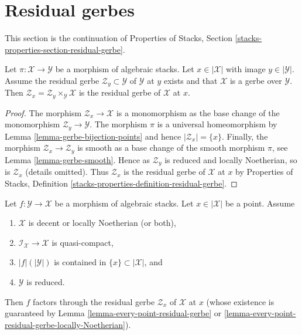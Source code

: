 \section{Residual gerbes}
\label{section-residual-gerbe}

\noindent
This section is the continuation of Properties of Stacks, Section
\ref{stacks-properties-section-residual-gerbe}.

\begin{lemma}
\label{lemma-gerbe-residual-gerbe}
Let $\pi : \mathcal{X} \to \mathcal{Y}$ be a morphism of algebraic stacks.
Let $x \in |\mathcal{X}|$ with image $y \in |\mathcal{Y}|$.
Assume the residual gerbe $\mathcal{Z}_y \subset \mathcal{Y}$
of $\mathcal{Y}$ at $y$ exists and that $\mathcal{X}$ is a gerbe
over $\mathcal{Y}$. Then
$\mathcal{Z}_x = \mathcal{Z}_y \times_\mathcal{Y} \mathcal{X}$ is
the residual gerbe of $\mathcal{X}$ at $x$.
\end{lemma}

\begin{proof}
The morphism $\mathcal{Z}_x \to \mathcal{X}$ is a monomorphism as
the base change of the monomorphism $\mathcal{Z}_y \to \mathcal{Y}$.
The morphism $\pi$ is a universal homeomorphism by
Lemma \ref{lemma-gerbe-bijection-points} and hence $|\mathcal{Z}_x| = \{x\}$.
Finally, the morphism $\mathcal{Z}_x \to \mathcal{Z}_y$ is smooth
as a base change of the smooth morphism $\pi$, see
Lemma \ref{lemma-gerbe-smooth}.
Hence as $\mathcal{Z}_y$ is reduced and locally Noetherian, so
is $\mathcal{Z}_x$ (details omitted). Thus $\mathcal{Z}_x$ is
the residual gerbe of $\mathcal{X}$ at $x$ by
Properties of Stacks, Definition
\ref{stacks-properties-definition-residual-gerbe}.
\end{proof}

\begin{lemma}
\label{lemma-factor-through-residual-space}
Let $f : \mathcal{Y} \to \mathcal{X}$ be a morphism of algebraic stacks.
Let $x \in |\mathcal{X}|$ be a point. Assume
\begin{enumerate}
\item $\mathcal{X}$ is decent or locally Noetherian (or both),
\item $\mathcal{I}_\mathcal{X} \to \mathcal{X}$ is quasi-compact,
\item $|f|(|\mathcal{Y}|)$ is contained in $\{x\} \subset |\mathcal{X}|$, and
\item $\mathcal{Y}$ is reduced.
\end{enumerate}
Then $f$ factors through the residual gerbe $\mathcal{Z}_x$
of $\mathcal{X}$ at $x$ (whose existence is guaranteed by
Lemma \ref{lemma-every-point-residual-gerbe} or
\ref{lemma-every-point-residual-gerbe-locally-Noetherian}).
\end{lemma}

